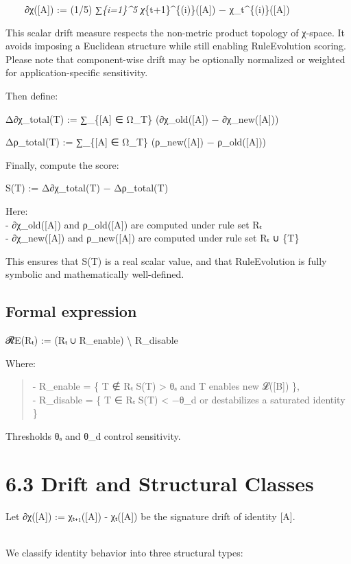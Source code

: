   ∂χ({[}A{]}) := (1/5) ∑\emph{\{i=1\}\^{}5
\textbar χ}\{t+1\}\^{}\{(i)\}({[}A{]}) −
χ\_t\^{}\{(i)\}({[}A{]})\textbar{}

This scalar drift measure respects the non-metric product topology of
χ-space. It avoids imposing a Euclidean structure while still enabling
RuleEvolution scoring. Please note that component-wise drift may be
optionally normalized or weighted for application-specific sensitivity.

Then define:

Δ∂χ\_total(T) := ∑\_\{{[}A{]} ∈ Ω\_T\} (∂χ\_old({[}A{]}) −
∂χ\_new({[}A{]}))

Δρ\_total(T) := ∑\_\{{[}A{]} ∈ Ω\_T\} (ρ\_new({[}A{]}) −
ρ\_old({[}A{]}))

Finally, compute the score:

S(T) := Δ∂χ\_total(T) − Δρ\_total(T)

Here:\\
- ∂χ\_old({[}A{]}) and ρ\_old({[}A{]}) are computed under rule set Rₜ\\
- ∂χ\_new({[}A{]}) and ρ\_new({[}A{]}) are computed under rule set Rₜ ∪
\{T\}

This ensures that S(T) is a real scalar value, and that RuleEvolution is
fully symbolic and mathematically well-defined.

\subsection{Formal expression}\label{formal-expression}

𝓡E(Rₜ) := (Rₜ ∪ R\_enable) \textbackslash{} R\_disable

Where:

\begin{quote}
- R\_enable = \{ T ∉ Rₜ \textbar{} S(T) \textgreater{} θₐ and T enables
new 𝓛({[}B{]}) \},\\
- R\_disable = \{ T ∈ Rₜ \textbar{} S(T) \textless{} −θ\_d or
destabilizes a saturated identity \}
\end{quote}

Thresholds θₐ and θ\_d control sensitivity.

\section{6.3 \textbar{} Drift and Structural
Classes}\label{drift-and-structural-classes}

Let ∂χ({[}A{]}) := χₜ₊₁({[}A{]}) - χₜ({[}A{]}) be the signature drift of
identity {[}A{]}.\\
\strut \\
We classify identity behavior into three structural types:

